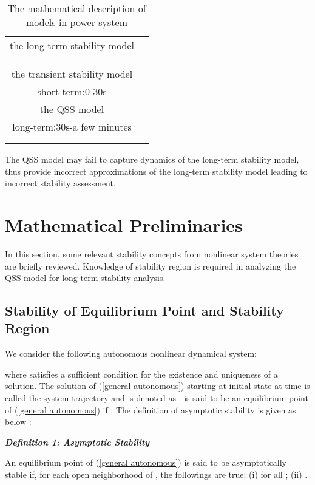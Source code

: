 \documentclass[journal]{IEEEtran}
\begin{document}
\begin{center}
\begin{table}[h]
\centering
\caption{The mathematical description of models in power system}\label{table1}
\begin{tabular}{|c|c|}
\hline
the long-term stability model&
\\
&\\
&\\
&\\
\hline
the transient stability model&\\
short-term:0-30s&\\
\hline
the QSS model&\\
long-term:30s-a few minutes&\\
&\\
&\\
\hline
\end{tabular}
\end{table}
\end{center}

The QSS model may fail to capture dynamics of the long-term stability model, thus provide incorrect approximations of the long-term stability model leading to incorrect stability assessment.
\section{Mathematical Preliminaries}\label{mathprelim}
In this section, some relevant stability concepts from nonlinear system theories are briefly reviewed. Knowledge of stability region is required in analyzing the QSS model for long-term stability analysis.

\subsection{Stability of Equilibrium Point and Stability Region}
We consider the following autonomous nonlinear dynamical system:

where  satisfies a sufficient condition for the existence and uniqueness of a solution. The solution of (\ref{general autonomous}) starting at initial state  at time  is called the system trajectory and is denoted as .  is said to be an equilibrium point of (\ref{general autonomous}) if . The definition of asymptotic stability is given as below \cite{Chiang:book}:

\noindent\textit{\textbf{Definition 1: Asymptotic Stability}}

An equilibrium point  of (\ref{general autonomous}) is said to be asymptotically stable if, for each open neighborhood  of , the followings are true: (i)  for all ; (ii) .
\end{document}
